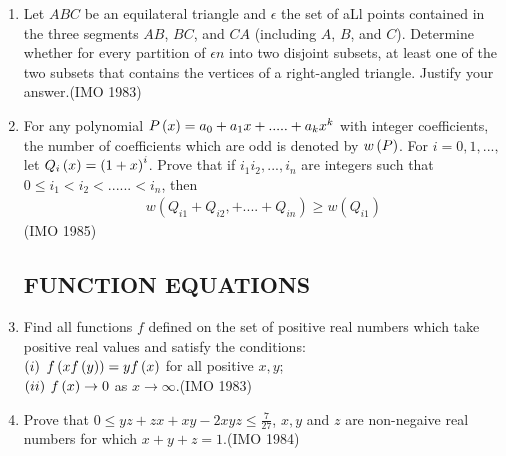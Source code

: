 \begin{enumerate}
	\item Let $ABC$ be an equilateral triangle and $\epsilon$ the set of aLl points contained in the three segments $AB$, $BC$, and $CA$ (including $A$, $B$, and $C$). Determine whether for every partition of $\epsilon n$ into two disjoint subsets, at least one of the two subsets that contains the vertices of a right-angled triangle. Justify your answer.\hfill(IMO 1983)

	\item For any polynomial $P\left(x\right) = a_0 + a_1x + ..... + a_kx^k$ with integer coefficients,  the number of coefficients which are odd is denoted by $w\left(P\right)$.  For $i = 0, 1, ..., $let $Q_i\left(x\right) = \left(1+x\right)^i$. Prove that if $i_1i_2, ..., i_n$ are integers such that  $0\leq i_1<i_2<......<i_n$, then \begin{align*}  w (Q_{i1}+Q_{i2},+....+Q_{in})\geq w (Q_{i1}) \end{align*}\hfill(IMO 1985)                                     

	\subsection*{FUNCTION EQUATIONS}

\item Find all functions $f$ defined on the set of positive real numbers which take positive real values and satisfy the conditions:\\ $\left(i\right)$ $f\left(xf\left(y\right)\right) = yf\left(x\right)$ for all positive $x,y$;\\   $\left(ii\right)$ $f\left(x\right) \rightarrow 0 $ as $ x \rightarrow \infty$.\hfill(IMO 1983)


\item Prove that $0 \leq yz+zx+xy-2xyz \leq \frac{7}{27}$, $x,y$ and $z$ are non-negaive real numbers for which $x+y+z=1$.\hfill(IMO 1984)

\end{enumerate}
